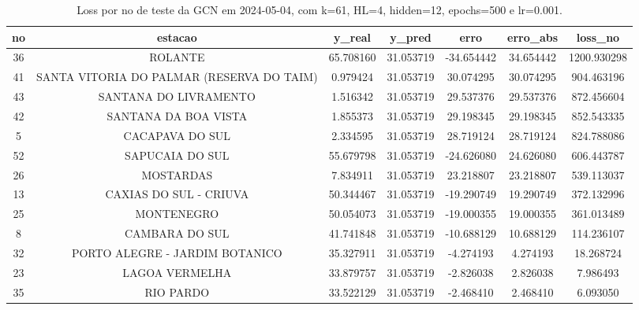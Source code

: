 \begin{table}[h]
\centering
\caption{Loss por no de teste da GCN em 2024-05-04, com k=61, HL=4, hidden=12, epochs=500 e lr=0.001.}
\label{tab:gcn_loss_k61_hl4_h12_e500_d20240504}
\begin{tabular}{ccccccc}
\toprule
no & estacao & y\_real & y\_pred & erro & erro\_abs & loss\_no \\
\midrule
36 & ROLANTE & 65.708160 & 31.053719 & -34.654442 & 34.654442 & 1200.930298 \\
41 & SANTA VITORIA DO PALMAR (RESERVA DO TAIM) & 0.979424 & 31.053719 & 30.074295 & 30.074295 & 904.463196 \\
43 & SANTANA DO LIVRAMENTO & 1.516342 & 31.053719 & 29.537376 & 29.537376 & 872.456604 \\
42 & SANTANA DA BOA VISTA & 1.855373 & 31.053719 & 29.198345 & 29.198345 & 852.543335 \\
5 & CACAPAVA DO SUL & 2.334595 & 31.053719 & 28.719124 & 28.719124 & 824.788086 \\
52 & SAPUCAIA DO SUL & 55.679798 & 31.053719 & -24.626080 & 24.626080 & 606.443787 \\
26 & MOSTARDAS & 7.834911 & 31.053719 & 23.218807 & 23.218807 & 539.113037 \\
13 & CAXIAS DO SUL - CRIUVA & 50.344467 & 31.053719 & -19.290749 & 19.290749 & 372.132996 \\
25 & MONTENEGRO & 50.054073 & 31.053719 & -19.000355 & 19.000355 & 361.013489 \\
8 & CAMBARA DO SUL & 41.741848 & 31.053719 & -10.688129 & 10.688129 & 114.236107 \\
32 & PORTO ALEGRE - JARDIM BOTANICO & 35.327911 & 31.053719 & -4.274193 & 4.274193 & 18.268724 \\
23 & LAGOA VERMELHA & 33.879757 & 31.053719 & -2.826038 & 2.826038 & 7.986493 \\
35 & RIO PARDO & 33.522129 & 31.053719 & -2.468410 & 2.468410 & 6.093050 \\
\bottomrule
\end{tabular}
\end{table}

